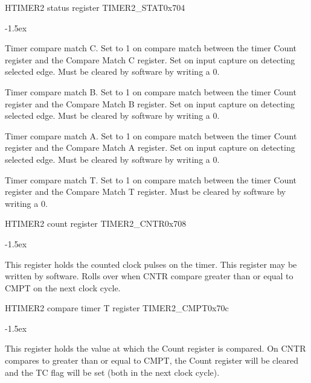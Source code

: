 \documentclass[12pt]{article}
\begin{document}
\begin{register}{H}{TIMER2 status register TIMER2\_STAT}{0x704}
\label{timer2stat}
%
%
%
%
%
\regnewline%
\end{register}
\begin{regdesc}[0.8\textwidth]\begin{reglist}[0000]
\itemsep-1.5ex
\item[CC] Timer compare match C. Set to 1 on compare match between the timer Count register and the Compare Match C register. Set on input capture on detecting selected edge. Must be cleared by software by writing a 0.
\item[BC] Timer compare match B. Set to 1 on compare match between the timer Count register and the Compare Match B register. Set on input capture on detecting selected edge. Must be cleared by software by writing a 0.
\item[AC] Timer compare match A. Set to 1 on compare match between the timer Count register and the Compare Match A register. Set on input capture on detecting selected edge. Must be cleared by software by writing a 0.
\item[TC] Timer compare match T. Set to 1 on compare match between the timer Count register and the Compare Match T register. Must be cleared by software by writing a 0.
\end{reglist}\end{regdesc}

\begin{register}{H}{TIMER2 count register TIMER2\_CNTR}{0x708}
\label{timer2cntr}
%
%
\regnewline%
\end{register}
\begin{regdesc}[0.8\textwidth]\begin{reglist}[00000]
\itemsep-1.5ex
\item[CNTR] This register holds the counted clock pulses on the timer. This register may be written by software. Rolls over when CNTR compare greater than or equal to CMPT on the next clock cycle.
\end{reglist}\end{regdesc}

\begin{register}{H}{TIMER2 compare timer T register TIMER2\_CMPT}{0x70c}
\label{timer2cmpt}
%
\regnewline%
\end{register}
\begin{regdesc}[0.8\textwidth]\begin{reglist}[00000]
\itemsep-1.5ex
\item[CMPT] This register holds the value at which the Count register is compared. On CNTR compares to greater than or equal to CMPT, the Count register will be cleared and the TC flag will be set (both in the next clock cycle).
\end{reglist}\end{regdesc}
\end{document}
